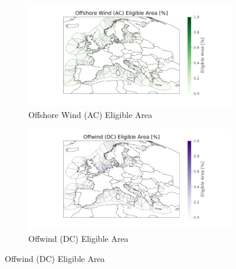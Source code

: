 \begin{figure}[htp]
    \centering
    \begin{subfigure}{0.45\textwidth}
        \includegraphics[width=\textwidth, trim=3.5cm 0cm 2.5cm 0cm, clip]{Figure/offshore_wind_AC_eligible_area_mesh.png}
        \caption{Offshore Wind (AC) Eligible Area}
    \end{subfigure}
    \hfill
    \begin{subfigure}{0.45\textwidth}
        \includegraphics[width=\textwidth, trim=3.5cm 0cm 2.5cm 0cm, clip]{Figure/offshore_wind_DC_eligible_area_mesh.png}
        \caption{Offwind (DC) Eligible Area}
    \end{subfigure}
    

\end{figure}
